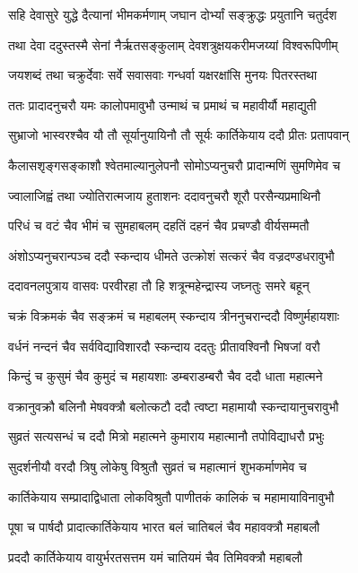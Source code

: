\twolineshloka
{सहि देवासुरे युद्धे दैत्यानां भीमकर्मणाम्}
{जघान दोर्भ्यां सङ्क्रुद्धः प्रयुतानि चतुर्दश}


\twolineshloka
{तथा देवा ददुस्तस्मै सेनां नैर्ऋतसङ्कुलाम्}
{देवशत्रुक्षयकरीमजय्यां विश्वरूपिणीम्}


\twolineshloka
{जयशब्दं तथा चक्रुर्देवाः सर्वे सवासवाः}
{गन्धर्वा यक्षरक्षांसि मुनयः पितरस्तथा}


\twolineshloka
{ततः प्रादादनुचरौ यमः कालोपमावुभौ}
{उन्माथं च प्रमाथं च महावीर्यौ महाद्युती}


\twolineshloka
{सुभ्राजो भास्वरश्चैव यौ तौ सूर्यानुयायिनौ}
{तौ सूर्यः कार्तिकेयाय ददौ प्रीतः प्रतापवान्}


\twolineshloka
{कैलासशृङ्गसङ्काशौ श्वेतमाल्यानुलेपनौ}
{सोमोऽप्यनुचरौ प्रादान्मणिं सुमणिमेव च}


\twolineshloka
{ज्वालाजिह्वं तथा ज्योतिरात्मजाय हुताशनः}
{ददावनुचरौ शूरौ परसैन्यप्रमाथिनौ}


\twolineshloka
{परिधं च वटं चैव भीमं च सुमहाबलम्}
{दहतिं दहनं चैव प्रचण्डौ वीर्यसम्मतौ}


\twolineshloka
{अंशोऽप्यनुचरान्पञ्च ददौ स्कन्दाय धीमते}
{उत्क्रोशं सत्करं चैव वज्रदण्डधरावुभौ}


\twolineshloka
{ददावनलपुत्राय वासवः परवीरहा}
{तौ हि शत्रून्महेन्द्रास्य जघ्नतुः समरे बहून्}


\twolineshloka
{चक्रं विक्रमकं चैव सङ्क्रमं च महाबलम्}
{स्कन्दाय त्रीननुचरान्ददौ विष्णुर्महायशाः}


\twolineshloka
{वर्धनं नन्दनं चैव सर्वविद्याविशारदौ}
{स्कन्दाय ददतुः प्रीतावश्विनौ भिषजां वरौ}


\twolineshloka
{किन्दुं च कुसुमं चैव कुमुदं च महायशाः}
{डम्बराडम्बरौ चैव ददौ धाता महात्मने}


\twolineshloka
{वक्रानुवक्रौ बलिनौ मेषवक्त्रौ बलोत्कटौ}
{ददौ त्वष्टा महामायौ स्कन्दायानुचरावुभौ}


\twolineshloka
{सुव्रतं सत्यसन्धं च ददौ मित्रो महात्मने}
{कुमाराय महात्मानौ तपोविद्याधरौ प्रभुः}


\twolineshloka
{सुदर्शनीयौ वरदौ त्रिषु लोकेषु विश्रुतौ}
{सुव्रतं च महात्मानं शुभकर्माणमेव च}


\twolineshloka
{कार्तिकेयाय सम्प्रादाद्विधाता लोकविश्रुतौ}
{पाणीतकं कालिकं च महामायाविनावुभौ}


\twolineshloka
{पूषा च पार्षदौ प्रादात्कार्तिकेयाय भारत}
{बलं चातिबलं चैव महावक्त्रौ महाबलौ}


\twolineshloka
{प्रददौ कार्तिकेयाय वायुर्भरतसत्तम}
{यमं चातियमं चैव तिमिवक्त्रौ महाबलौ}


